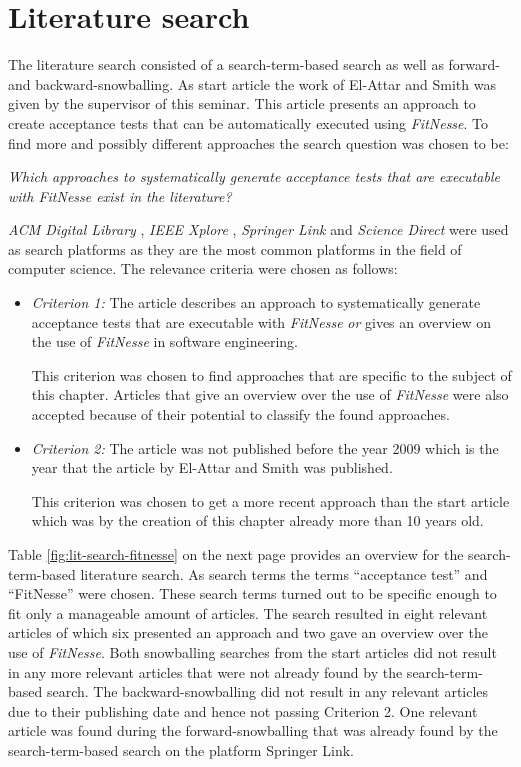\section{Literature search}
\label{sec:literature-search}

The literature search consisted of a search-term-based search as well as forward- and backward-snowballing.
As start article the work of El-Attar and Smith \cite{el-attar} was given by the supervisor of this seminar.
This article presents an approach to create acceptance tests that can be automatically executed using \textit{FitNesse}.
To find more and possibly different approaches the search question was chosen to be:

\begin{center}
\textit{
 Which approaches to systematically generate acceptance tests that are executable with \textit{FitNesse} exist in the literature?
}
\end{center}

\textit{ACM Digital Library} \cite{acm}, \textit{IEEE Xplore} \cite{ieee}, \textit{Springer Link} \cite{springer} and \textit{Science Direct} \cite{elsevier} were used as search platforms as they are the most common platforms in the field of computer science.
The relevance criteria were chosen as follows:
\begin{itemize}
	\item \textit{Criterion 1:} The article describes an approach to systematically generate acceptance tests that are executable with \textit{FitNesse} \textit{or} gives an overview on the use of \textit{FitNesse} in software engineering.
	
	This criterion was chosen to find approaches that are specific to the subject of this chapter.
	Articles that give an overview over the use of \textit{FitNesse} were also accepted because of their potential to classify the found approaches.
	
	\item \textit{Criterion 2:} The article was not published before the year 2009 which is the year that the article by El-Attar and Smith was published.
	
	This criterion was chosen to get a more recent approach than the start article which was by the creation of this chapter already more than 10 years old.
\end{itemize}

Table \ref{fig:lit-search-fitnesse} on the next page provides an overview for the search-term-based literature search.
As search terms the terms \enquote{acceptance test} and \enquote{FitNesse} were chosen.
These search terms turned out to be specific enough to fit only a manageable amount of articles.
The search resulted in eight relevant articles of which six presented an approach and two gave an overview over the use of \textit{FitNesse}.
Both snowballing searches from the start articles did not result in any more relevant articles that were not already found by the search-term-based search.
The backward-snowballing did not result in any relevant articles due to their publishing date and hence not passing Criterion 2.
One relevant article was found during the forward-snowballing that was already found by the search-term-based search on the platform Springer Link.

